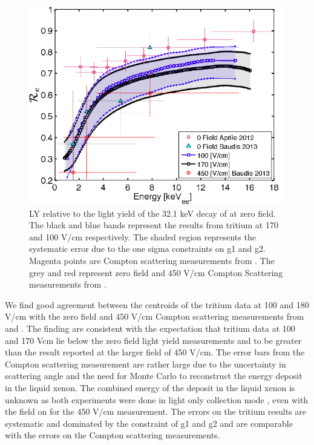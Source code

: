  \begin{figure}[h!]\centering
 \includegraphics[width=150mm]{Chapter_Flucs/Figures/LYQY_iter1/Re_fig.png}
\caption{LY relative to the light yield of the 32.1 keV decay of \KrCal at zero field. The black and blue bands represent the results from tritium at 170 and 100 V/cm respectively. The shaded region represents the systematic error due to the one sigma constraints on g1 and g2.  Magenta points are Compton scattering measurements from \cite{Aprile_LY}. The grey and red represent zero field and 450 V/cm Compton Scattering measurements from \cite{Baudis}. }
\label{fig:Re}
\end{figure}

We find good agreement between the centroids of the tritium data at 100 and 180 V/cm with the zero field and 450 V/cm Compton scattering measurements from \cite{Aprile_LY} and \cite{Baudis}. The finding are consistent with the expectation that tritium data at 100 and 170 Vcm lie below the zero field light yield measurements and to be greater than the result reported at the larger field of 450 V/cm. The error bars from the Compton scattering measurement are rather large due to the uncertainty in scattering angle and the need for Monte Carlo to reconstruct the energy deposit in the liquid xenon. The combined energy of the deposit in the liquid xenon is unknown as both experiments were done in light only collection mode \cite{Aprile_LY}  \cite{Baudis}, even with the field on for the 450 V/cm measurement. The errors on the tritium results are systematic and dominated by the constraint of g1 and g2 and are comparable with the errors on the Compton scattering measurements. 

